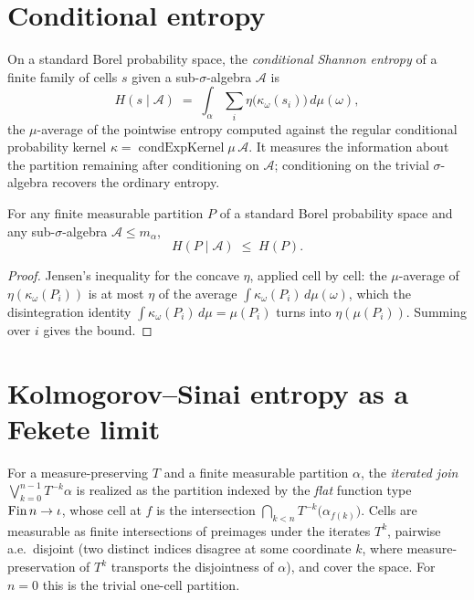 \section{Conditional entropy}

\begin{definition}\label{condEntropyPartition}
  \leanok
  On a standard Borel probability space, the \emph{conditional Shannon entropy} of a finite
  family of cells \(s\) given a sub-\(\sigma\)-algebra \(\mathcal A\) is
  \[
    H(s \mid \mathcal A) \;=\; \int_\alpha \sum_i \eta\bigl(\kappa_\omega(s_i)\bigr)\,d\mu(\omega),
  \]
  the \(\mu\)-average of the pointwise entropy computed against the regular conditional
  probability kernel \(\kappa=\operatorname{condExpKernel}\mu\,\mathcal A\). It measures the
  information about the partition remaining after conditioning on \(\mathcal A\); conditioning on
  the trivial \(\sigma\)-algebra recovers the ordinary entropy.
\end{definition}

\begin{theorem}\label{condEntropy_le}
  \leanok
  For any finite measurable partition \(P\) of a standard Borel probability space and any
  sub-\(\sigma\)-algebra \(\mathcal A\le m_\alpha\),
  \[
    H(P \mid \mathcal A) \;\le\; H(P).
  \]
\end{theorem}
\begin{proof}\leanok
  Jensen's inequality for the concave \(\eta\), applied cell by cell: the \(\mu\)-average of
  \(\eta(\kappa_\omega(P_i))\) is at most \(\eta\) of the average
  \(\int\kappa_\omega(P_i)\,d\mu(\omega)\), which the disintegration identity
  \(\int\kappa_\omega(P_i)\,d\mu = \mu(P_i)\) turns into \(\eta(\mu(P_i))\). Summing over \(i\)
  gives the bound.
\end{proof}

\section{Kolmogorov--Sinai entropy as a Fekete limit}

\begin{definition}\label{ksJoin}
  \leanok
  For a measure-preserving \(T\) and a finite measurable partition \(\alpha\), the \emph{iterated
  join} \(\bigvee_{k=0}^{n-1}T^{-k}\alpha\) is realized as the partition indexed by the
  \emph{flat} function type \(\operatorname{Fin} n\to\iota\), whose cell at \(f\) is the intersection
  \(\bigcap_{k<n} T^{-k}\bigl(\alpha_{f(k)}\bigr)\). Cells are measurable as finite intersections
  of preimages under the iterates \(T^k\), pairwise a.e.\ disjoint (two distinct indices disagree
  at some coordinate \(k\), where measure-preservation of \(T^k\) transports the disjointness of
  \(\alpha\)), and cover the space. For \(n=0\) this is the trivial one-cell partition.
\end{definition}

